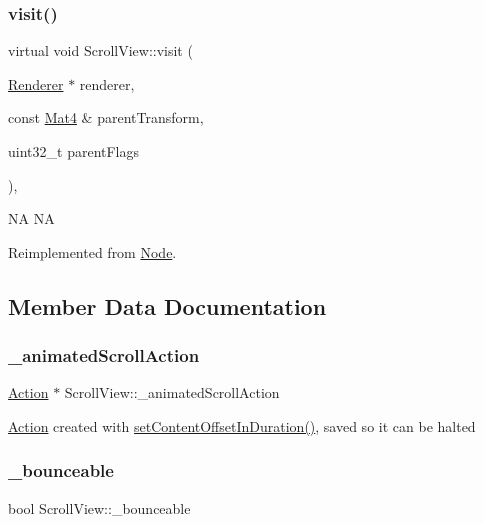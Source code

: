 \subsubsection{\texorpdfstring{visit()}{visit()}\hspace{0.1cm}{\footnotesize\ttfamily [2/2]}}
{\footnotesize\ttfamily virtual void Scroll\+View\+::visit (\begin{DoxyParamCaption}\item[{\hyperlink{classRenderer}{Renderer} $\ast$}]{renderer,  }\item[{const \hyperlink{classMat4}{Mat4} \&}]{parent\+Transform,  }\item[{uint32\+\_\+t}]{parent\+Flags }\end{DoxyParamCaption})\hspace{0.3cm}{\ttfamily [override]}, {\ttfamily [virtual]}}

NA  NA 

Reimplemented from \hyperlink{classNode_a7d794a5e30745611ec33881a625edf26}{Node}.



\subsection{Member Data Documentation}
\mbox{\label{classScrollView_a42ddc8c9146791b538cd9dbd102a2b1d}} 
\subsubsection{\texorpdfstring{\+\_\+animated\+Scroll\+Action}{\_animatedScrollAction}}
{\footnotesize\ttfamily \hyperlink{classAction}{Action} $\ast$ Scroll\+View\+::\+\_\+animated\+Scroll\+Action\hspace{0.3cm}{\ttfamily [protected]}}

\hyperlink{classAction}{Action} created with \hyperlink{classScrollView_ad98397d42075b810de17c35eb9843ec7}{set\+Content\+Offset\+In\+Duration()}, saved so it can be halted \mbox{\label{classScrollView_a303fdf5ed50f0a9dc15912669de54b24}} 
\subsubsection{\texorpdfstring{\+\_\+bounceable}{\_bounceable}}
{\footnotesize\ttfamily bool Scroll\+View\+::\+\_\+bounceable\hspace{0.3cm}{\ttfamily [protected]}}

